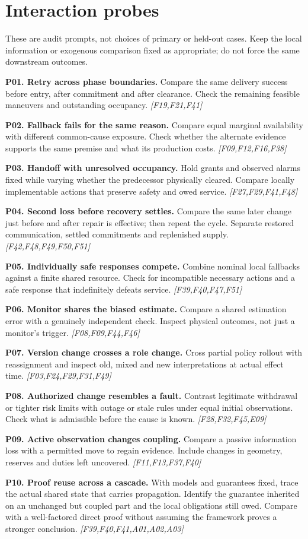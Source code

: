 \documentclass[11pt]{article}
\newcommand{\f}[4]{\par\smallskip\noindent\textbf{#1. #2.} #3 \textit{[#4]}\par}
\begin{document}
\section{Interaction probes}
These are audit prompts, not choices of primary or held-out cases. Keep the local information or exogenous comparison fixed as appropriate; do not force the same downstream outcomes.
\f{P01}{Retry across phase boundaries}{Compare the same delivery success before entry, after commitment and after clearance. Check the remaining feasible maneuvers and outstanding occupancy.}{F19,F21,F41}
\f{P02}{Fallback fails for the same reason}{Compare equal marginal availability with different common-cause exposure. Check whether the alternate evidence supports the same premise and what its production costs.}{F09,F12,F16,F38}
\f{P03}{Handoff with unresolved occupancy}{Hold grants and observed alarms fixed while varying whether the predecessor physically cleared. Compare locally implementable actions that preserve safety and owed service.}{F27,F29,F41,F48}
\f{P04}{Second loss before recovery settles}{Compare the same later change just before and after repair is effective; then repeat the cycle. Separate restored communication, settled commitments and replenished supply.}{F42,F48,F49,F50,F51}
\f{P05}{Individually safe responses compete}{Combine nominal local fallbacks against a finite shared resource. Check for incompatible necessary actions and a safe response that indefinitely defeats service.}{F39,F40,F47,F51}
\f{P06}{Monitor shares the biased estimate}{Compare a shared estimation error with a genuinely independent check. Inspect physical outcomes, not just a monitor's trigger.}{F08,F09,F44,F46}
\f{P07}{Version change crosses a role change}{Cross partial policy rollout with reassignment and inspect old, mixed and new interpretations at actual effect time.}{F03,F24,F29,F31,F49}
\f{P08}{Authorized change resembles a fault}{Contrast legitimate withdrawal or tighter risk limits with outage or stale rules under equal initial observations. Check what is admissible before the cause is known.}{F28,F32,F45,E09}
\f{P09}{Active observation changes coupling}{Compare a passive information loss with a permitted move to regain evidence. Include changes in geometry, reserves and duties left uncovered.}{F11,F13,F37,F40}
\f{P10}{Proof reuse across a cascade}{With models and guarantees fixed, trace the actual shared state that carries propagation. Identify the guarantee inherited on an unchanged but coupled part and the local obligations still owed. Compare with a well-factored direct proof without assuming the framework proves a stronger conclusion.}{F39,F40,F41,A01,A02,A03}
\end{document}
